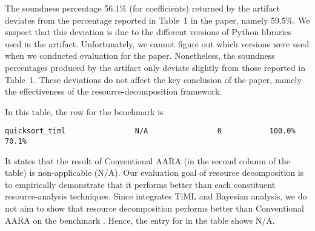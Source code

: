 The soundness percentage 56.1\% (for coefficients) returned by the artifact
deviates from the percentage reported in Table~1 in the paper, namely 59.5\%.
%
We suspect that this deviation is due to the different versions of Python
libraries used in the artifact.
%
Unfortunately, we cannot figure out which versions were used when we conducted
evaluation for the paper.
%
Nonetheless, the soundness percentages produced by the artifact only deviate
slightly from those reported in Table~1.
%
These deviations do not affect the key conclusion of the paper, namely the
effectiveness of the resource-decomposition framework.

In this table, the row for the benchmark \quicksorttiml{} is
\begin{verbatim}
quicksort_timl                N/A                0           100.0%         70.1%
\end{verbatim}
%
It states that the result of Conventional AARA (in the second column of the
table) is non-applicable (N/A).
%
Our evaluation goal of resource decomposition is to empirically demonstrate that
it performs better than each constituent resource-analysis techniques.
%
Since  integrates TiML and Bayesian
analysis, we do not aim to show that resource decomposition performs better than
Conventional AARA on the benchmark \quicksorttiml{}.
%
Hence, the entry for \quicksorttiml{} in the table shows N/A.
